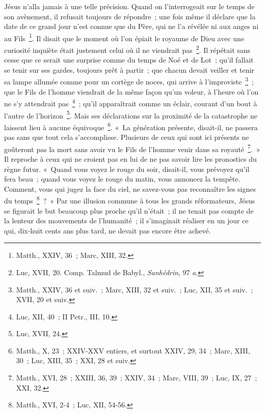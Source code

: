 \documentclass[french,twoside]{book} %
\begin{document}
Jésus n’alla jamais à une telle précision. Quand on l’interrogeait sur le temps de son avènement, il refusait toujours de répondre ; une fois même il déclare que la date de ce grand jour n’est connue que du Père, qui ne l’a révélée ni aux anges ni au Fils \footnote{Matth., XXIV, 36 ; Marc, XIII, 32.}. Il disait que le moment où l’on épiait le royaume de Dieu avec une curiosité inquiète était justement celui où il ne viendrait pas \footnote{ Luc, XVII, 20. Comp. Talmud de Babyl., {\itshape Sanhédrin}, 97 {\itshape a}.}. Il répétait sans cesse que ce serait une surprise comme du temps de Noé et de Lot ; qu’il fallait se tenir sur ses gardes, toujours prêt à partir ; que chacun devait veiller et tenir sa lampe allumée comme pour un cortège de noces, qui arrive à l’improviste \footnote{Matth., XXIV, 36 et suiv. ; Marc, XIII, 32 et suiv. ; Luc, XII, 35 et suiv. ; XVII, 20 et suiv.} ; que le Fils de l’homme viendrait de la même façon qu’un voleur, à l’heure où l’on ne s’y attendrait pas \footnote{Luc, XII, 40 ; II Petr., III, 10.} ; qu’il apparaîtrait comme un éclair, courant d’un bout à l’autre de l’horizon \footnote{Luc, XVII, 24.}. Mais ses déclarations sur la proximité de la catastrophe ne laissent lieu à aucune équivoque \footnote{Matth., X, 23 ; XXIV-XXV entiers, et surtout XXIV, 29, 34 ; Marc, XIII, 30 ; Luc, XIII, 35 ; XXI, 28 et suiv.}. « La génération présente, disait-il, ne passera pas sans que tout cela s’accomplisse. Plusieurs de ceux qui sont ici présents ne goûteront pas la mort sans avoir vu le Fils de l’homme venir dans sa royauté \footnote{Matth., XVI, 28 ; XXIII, 36, 39 ; XXIV, 34 ; Marc, VIII, 39 ; Luc, IX, 27 ; XXI, 32.}. » Il reproche à ceux qui ne croient pas en lui de ne pas savoir lire les pronostics du règne futur. « Quand vous voyez le rouge du soir, disait-il, vous prévoyez qu’il fera beau ; quand vous voyez le rouge du matin, vous annoncez la tempête. Comment, vous qui jugez la face du ciel, ne savez-vous pas reconnaître les signes du temps \footnote{Matth., XVI, 2-4 ; Luc, XII, 54-56.} ? » Par une illusion commune à tous les grands réformateurs, Jésus se figurait le but beaucoup plus proche qu’il n’était ; il ne tenait pas compte de la lenteur des mouvements de l’humanité ; il s’imaginait réaliser en un jour ce qui, dix-huit cents ans plus tard, ne devait pas encore être achevé.\par
\end{document}
